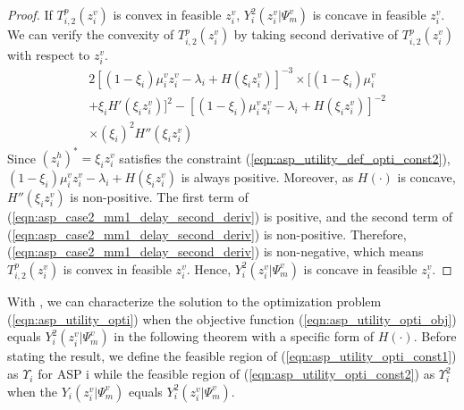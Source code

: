 \documentclass[conference]{IEEEtran}
\begin{document}
\begin{proof}
If $T_{i,2}^p(z_i^v)$ is convex in feasible $z_i^v$, $Y_i^2(z_i^v|\Psi_m^v)$ is concave in feasible $z_i^v$. We can verify the convexity of $T_{i,2}^p(z_i^v)$ by taking second derivative of $T_{i,2}^p(z_i^v)$ with respect to $z_i^v$.
\begin{equation} \label{eqn:asp_case2_mm1_delay_second_deriv}
\begin{aligned}
&2[(1-\xi_i)\mu_i^v z_i^v - \lambda_i + H(\xi_i z_i^v)]^{-3}\times [(1-\xi_i)\mu_i^v\\
&+ \xi_i H'(\xi_i z_i^v)]^2-[(1-\xi_i)\mu_i^v z_i^v - \lambda_i + H(\xi_i z_i^v)]^{-2}  \\
& \times (\xi_i)^2 H''(\xi_i z_i^v)
\end{aligned}{}
\end{equation}
Since $(z_i^h)^* = \xi_i z_i^v$ satisfies the constraint (\ref{eqn:asp_utility_def_opti_const2}), $(1-\xi_i)\mu_i^v z_i^v - \lambda_i + H(\xi_i z_i^v)$ is always positive. Moreover, as $H(\cdot)$ is concave, $H''(\xi_i z_i^v)$ is non-positive. The first term of (\ref{eqn:asp_case2_mm1_delay_second_deriv}) is positive, and the second term of (\ref{eqn:asp_case2_mm1_delay_second_deriv}) is non-positive. Therefore, (\ref{eqn:asp_case2_mm1_delay_second_deriv}) is non-negative, which means $T_{i,2}^p(z_i^v)$ is convex in feasible $z_i^v$. Hence, $Y_i^2(z_i^v|\Psi_m^v)$ is concave in feasible $z_i^v$. \qedhere
\end{proof}
With , we can characterize the solution to the optimization problem (\ref{eqn:asp_utility_opti}) when the objective function (\ref{eqn:asp_utility_opti_obj}) equals $Y_i^2(z_i^v|\Psi_m^v)$ in the following theorem with a specific form of $H(\cdot)$. Before stating the result, we define the feasible region of (\ref{eqn:asp_utility_opti_const1}) as $\Upsilon_i$ for ASP i while the feasible region of (\ref{eqn:asp_utility_opti_const2}) as $\Upsilon_i^2$ when the $Y_i(z_i^v|\Psi_m^v)$ equals $Y_i^2(z_i^v|\Psi_m^v)$.
\end{document}
